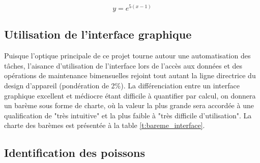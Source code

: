 \begin{equation}
    y = e^{5(x-1)}
    \label{eq:bareme_precision}
\end{equation}

\subsection{Utilisation de l'interface graphique}

\begin{table}[htb!]
   \footnotesize
   \centering
   \caption{Évaluation du barème de l'interface graphique}
   \label{t:bareme_interface}
\end{table}

Puisque l'optique principale de ce projet tourne autour une automatisation des tâches, l'aisance d'utilisation de l'interface lors de l'accès aux données et des opérations de maintenance bimensuelles rejoint tout autant la ligne directrice du design d'appareil (pondération de 2\%). La différenciation entre un interface graphique excellent et médiocre étant difficile à quantifier par calcul, on donnera un barème sous forme de charte, où la valeur la plus grande sera accordée à une qualification de "très intuitive" et la plus faible à "très difficile d'utilisation". La charte des barèmes est présentée à la table \ref{t:bareme_interface}. 

\subsection{Identification des poissons}

